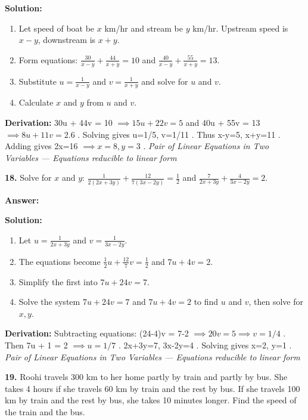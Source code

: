 \documentclass[12pt,a4paper]{exam}
\newcommand{\fitmath}[1]{%
  \sbox{\schmathbox}{$\displaystyle #1$}%
  \ifdim\wd\schmathbox>\linewidth
    \resizebox{\linewidth}{!}{\usebox{\schmathbox}}%
  \else
    \usebox{\schmathbox}%
  \fi}
\begin{document}
\begin{questions}
\textbf{Solution:}
\begin{enumerate}
  \item Let speed of boat be $x$ km/hr and stream be $y$ km/hr. Upstream speed is $x-y$, downstream is $x+y$.
  \item Form equations: $\frac{30}{x-y} + \frac{44}{x+y} = 10$ and $\frac{40}{x-y} + \frac{55}{x+y} = 13$.
  \item Substitute $u = \frac{1}{x-y}$ and $v = \frac{1}{x+y}$ and solve for $u$ and $v$.
  \item Calculate $x$ and $y$ from $u$ and $v$.
\end{enumerate}
\textbf{Derivation:}
 30u + 44v = 10 $\implies 15u + 22v = 5$  and  40u + 55v = 13 $\implies 8u + 11v = 2.6$ . Solving gives  u=1/5, v=1/11 . Thus  x-y=5, x+y=11 . Adding gives  2x=16 $\implies x=8, y=3$ .
\hfill \textit{Pair of Linear Equations in Two Variables — Equations reducible to linear form}
\vspace{0.3cm}

\question \textbf{18.} Solve for $x$ and $y$: $\frac{1}{2(2x+3y)} + \frac{12}{7(3x-2y)} = \frac{1}{2}$ and $\frac{7}{2x+3y} + \frac{4}{3x-2y} = 2$.

\textbf{Answer:}
\begin{center}
\fitmath{x = 2, y = 1}
\end{center}

\textbf{Solution:}
\begin{enumerate}
  \item Let $u = \frac{1}{2x+3y}$ and $v = \frac{1}{3x-2y}$.
  \item The equations become $\frac{1}{2}u + \frac{12}{7}v = \frac{1}{2}$ and $7u + 4v = 2$.
  \item Simplify the first into $7u + 24v = 7$.
  \item Solve the system $7u + 24v = 7$ and $7u + 4v = 2$ to find $u$ and $v$, then solve for $x, y$.
\end{enumerate}
\textbf{Derivation:}
Subtracting equations:  (24-4)v = 7-2 $\implies 20v = 5 \implies v = 1/4$ . Then  7u + 1 = 2 $\implies u = 1/7$ .  2x+3y=7, 3x-2y=4 . Solving gives  x=2, y=1 .
\hfill \textit{Pair of Linear Equations in Two Variables — Equations reducible to linear form}
\vspace{0.3cm}

\question \textbf{19.} Roohi travels 300 km to her home partly by train and partly by bus. She takes 4 hours if she travels 60 km by train and the rest by bus. If she travels 100 km by train and the rest by bus, she takes 10 minutes longer. Find the speed of the train and the bus.


\end{questions}
\end{document}
